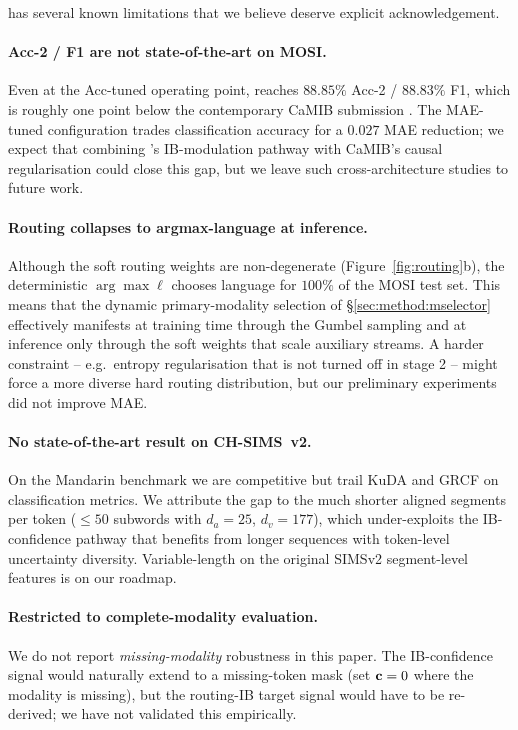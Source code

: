 \methodname{} has several known limitations that we believe deserve
explicit acknowledgement.

\paragraph{Acc-2 / F1 are not state-of-the-art on MOSI.}
Even at the Acc-tuned operating point, \methodname{} reaches
$88.85\%$ Acc-2 / $88.83\%$ F1, which is roughly one point below the
contemporary CaMIB submission \citep{camib2026}.
The MAE-tuned configuration trades classification accuracy for a
$0.027$ MAE reduction; we expect that combining \methodname{}'s
IB-modulation pathway with CaMIB's causal regularisation could close
this gap, but we leave such cross-architecture studies to future work.

\paragraph{Routing collapses to argmax-language at inference.}
Although the soft routing weights are non-degenerate
(Figure~\ref{fig:routing}b), the deterministic
$\arg\max\boldsymbol{\ell}$ chooses language for $100\%$ of the MOSI
test set.
This means that the dynamic primary-modality selection of
\S\ref{sec:method:mselector} effectively manifests at training time
through the Gumbel sampling and at inference only through the soft
weights that scale auxiliary streams.
A harder constraint -- e.g.\ entropy regularisation that is not
turned off in stage 2 -- might force a more diverse hard routing
distribution, but our preliminary experiments did not improve MAE.

\paragraph{No state-of-the-art result on CH-SIMS~v2.}
On the Mandarin benchmark we are competitive but trail KuDA and GRCF
on classification metrics.
We attribute the gap to the much shorter aligned segments per token
($\!\le\!50$ subwords with $d_{a}\!=\!25$, $d_{v}\!=\!177$), which
under-exploits the IB-confidence pathway that benefits from longer
sequences with token-level uncertainty diversity.
Variable-length \methodname{} on the original SIMSv2 segment-level
features is on our roadmap.

\paragraph{Restricted to complete-modality evaluation.}
We do not report \emph{missing-modality} robustness in this paper.
The IB-confidence signal would naturally extend to a missing-token
mask (set $\mathbf{c}=0$ where the modality is missing), but the routing-IB
target signal would have to be re-derived; we have not validated this
empirically.

